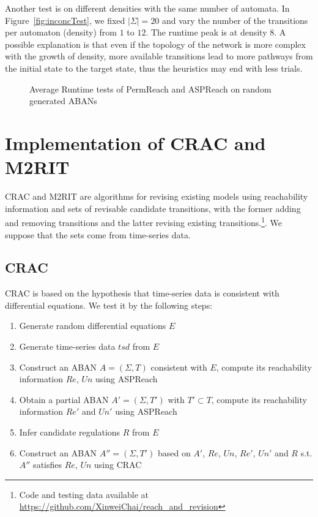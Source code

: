 Another test is on different densities with the same number of automata. 
In Figure~\ref{fig:inconcTest}, we fixed $|\Sigma|=20$ and vary the number of the transitions per automaton (density) from $1$ to $12$.
The runtime peak is at density 8.
A possible explanation is that even if the topology of the network is more complex with the growth of density, more available transitions lead to more pathways from the initial state to the target state, thus the heuristics may end with less trials.

\begin{figure}[ht]
    \caption[Runtime tests of reachability analyzers]{Average Runtime tests of PermReach and ASPReach on random generated ABANs}
\end{figure}

\section{Implementation of CRAC and M2RIT}
CRAC and M2RIT are algorithms for revising existing models using reachability information and sets of revisable candidate transitions, with the former adding and removing transitions and the latter revising existing transitions.\footnote{Code and testing data available at \url{https://github.com/XinweiChai/reach_and_revision}}.
We suppose that the sets come from time-series data.

\subsection{CRAC}
CRAC is based on the hypothesis that time-series data is consistent with differential equations.
We test it by the following steps:
\begin{enumerate}
    \item Generate random differential equations $E$
    \item Generate time-series data $tsd$ from $E$
    \item Construct an ABAN $A=(\Sigma, T)$ consistent with $E$, compute its reachability information $Re$, $Un$ using ASPReach
    \item Obtain a partial ABAN $A'=(\Sigma, T')$ with $T'\subset T$, compute its reachability information $Re'$ and $Un'$ using ASPReach
    \item Infer candidate regulations $R$ from $E$
    \item Construct an ABAN $A''=(\Sigma, T')$ based on $A'$, $Re$, $Un$, $Re'$, $Un'$ and $R$ s.t. $A''$ satisfies $Re$, $Un$ using CRAC
\end{enumerate}


